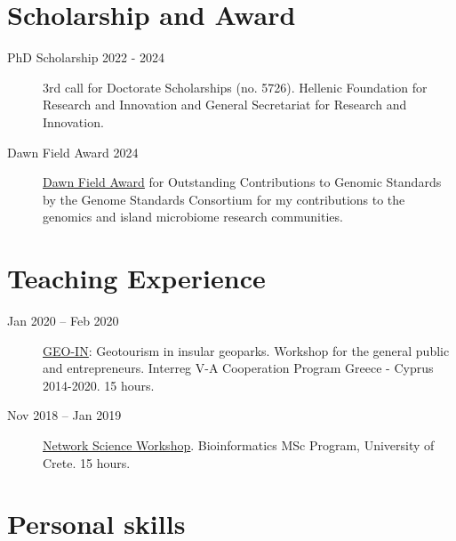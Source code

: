 \section{Scholarship and Award}

\begin{description}
    \item[PhD Scholarship 2022 - 2024] 3rd call for Doctorate Scholarships (no. 5726). Hellenic Foundation for Research and Innovation and General Secretariat for Research and Innovation.

    \item[Dawn Field Award 2024]
        \underline{\href{https://genomicsstandardsconsortium.github.io/GSC24-Tucson/pages/keynotes/}{Dawn Field Award}} for Outstanding Contributions to Genomic Standards by the
        Genome Standards Consortium for my contributions to the genomics and island microbiome research communities.

\end{description}

\section{Teaching Experience}

\begin{description}
    \item[Jan 2020 -- Feb 2020] \underline{\href{https://www.geo-in.eu}{GEO-IN}}: Geotourism in insular geoparks. Workshop for the general public and entrepreneurs. Interreg V-A Cooperation Program Greece - Cyprus 2014-2020. 15 hours.

    \item[Nov 2018 -- Jan 2019] {\underline{\href{https://savvas-paragkamian.github.io/network_science_workshop/}{Network Science Workshop}}}. Bioinformatics MSc Program, University of Crete. 15 hours.
  
\end{description}

\section{Personal skills}

